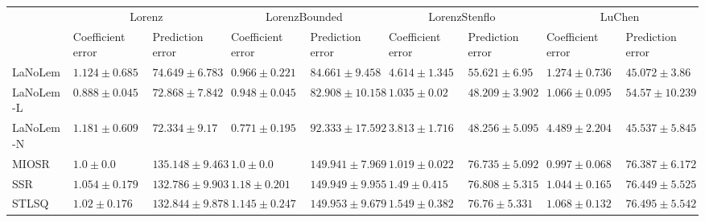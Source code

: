 \begin{table*}
{\begin{tabular}{lllllllll}
 & \multicolumn{2}{c}{Lorenz} & \multicolumn{2}{c}{LorenzBounded} & \multicolumn{2}{c}{LorenzStenflo} & \multicolumn{2}{c}{LuChen} \\
 & Coefficient error & Prediction error & Coefficient error & Prediction error & Coefficient error & Prediction error & Coefficient error & Prediction error \\
\midrule
LaNoLem & $1.124\pm 0.685$ & $74.649\pm 6.783$ & $0.966\pm 0.221$ & $84.661\pm 9.458$ & $4.614\pm 1.345$ & $55.621\pm 6.95$ & $1.274\pm 0.736$ & $\mathbf{45.072}\pm 3.86$ \\
LaNoLem-L & $\mathbf{0.888}\pm 0.045$ & $72.868\pm 7.842$ & $0.948\pm 0.045$ & $\mathbf{82.908}\pm 10.158$ & $1.035\pm 0.02$ & $\mathbf{48.209}\pm 3.902$ & $1.066\pm 0.095$ & $54.57\pm 10.239$ \\
LaNoLem-N & $1.181\pm 0.609$ & $\mathbf{72.334}\pm 9.17$ & $\mathbf{0.771}\pm 0.195$ & $92.333\pm 17.592$ & $3.813\pm 1.716$ & $48.256\pm 5.095$ & $4.489\pm 2.204$ & $45.537\pm 5.845$ \\
MIOSR & $1.0\pm 0.0$ & $135.148\pm 9.463$ & $1.0\pm 0.0$ & $149.941\pm 7.969$ & $\mathbf{1.019}\pm 0.022$ & $76.735\pm 5.092$ & $\mathbf{0.997}\pm 0.068$ & $76.387\pm 6.172$ \\
SSR & $1.054\pm 0.179$ & $132.786\pm 9.903$ & $1.18\pm 0.201$ & $149.949\pm 9.955$ & $1.49\pm 0.415$ & $76.808\pm 5.315$ & $1.044\pm 0.165$ & $76.449\pm 5.525$ \\
STLSQ & $1.02\pm 0.176$ & $132.844\pm 9.878$ & $1.145\pm 0.247$ & $149.953\pm 9.679$ & $1.549\pm 0.382$ & $76.76\pm 5.331$ & $1.068\pm 0.132$ & $76.495\pm 5.542$ \\

\midrule


\end{tabular}}
\end{table*}
